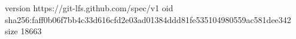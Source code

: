 version https://git-lfs.github.com/spec/v1
oid sha256:faff0b06f7bb4c33d616cfd2e03ad01384ddd81fe535104980559ac581dee342
size 18663
